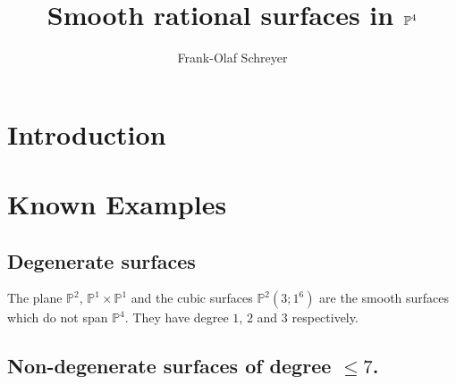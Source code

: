 \documentclass[twoside,12pt, leqno]{amsart}
\author[Frank-Olaf Schreyer]{Frank-Olaf Schreyer}
\title{Smooth rational surfaces in $\PP^{4}$}
\def\PP{{\mathbb P}}
\begin{document}
\maketitle

\section{Introduction}

\section{Known Examples}

\subsection{Degenerate surfaces}
The plane $\PP^{2}$, $\PP^{1}\times \PP^{1}$ and the cubic surfaces $\PP^{2}(3;1^{6})$  are the smooth surfaces which do not span $\PP^{4}$. They have degree $1$, $2$ and $3$
respectively.

\subsection{Non-degenerate surfaces of degree $\le 7$.}
\end{document}
